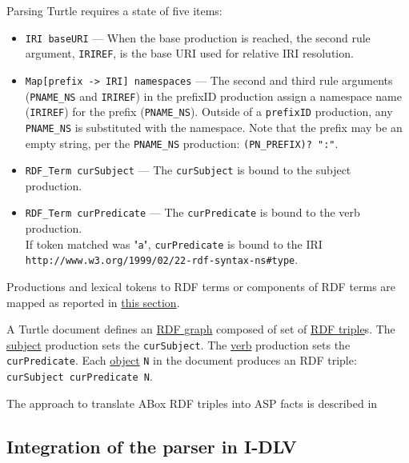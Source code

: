 \documentclass[oneside]{book}
\newcommand{\ste}[1]{\todo[color=green!40, bordercolor=green!80, author=Stefano]{#1}{}}
\begin{document}
Parsing Turtle requires a state of five items:
\begin{itemize}
	\item \texttt{IRI baseURI} — When the base production is reached, the second rule argument, \texttt{IRIREF}, is the base URI used for relative IRI resolution. 
	\item \texttt{Map[prefix -> IRI] namespaces} — The second and third rule arguments (\texttt{PNAME\_NS} and \texttt{IRIREF}) in the prefixID production assign a namespace name (\texttt{IRIREF}) for the prefix (\texttt{PNAME\_NS}). Outside of a \texttt{prefixID} production, any \texttt{PNAME\_NS} is substituted with the namespace. Note that the prefix may be an empty string, per the \texttt{PNAME\_NS} production: \texttt{(PN\_PREFIX)? ":"}. 
	\item \texttt{RDF\_Term curSubject} — The \texttt{curSubject} is bound to the subject production.
	\item \texttt{RDF\_Term curPredicate} — The \texttt{curPredicate} is bound to the verb production.\\
	If token matched was "\texttt{a}", \texttt{curPredicate} is bound to the IRI\\
	\texttt{http://www.w3.org/1999/02/22-rdf-syntax-ns\#type}.
\end{itemize}

Productions and lexical tokens to RDF terms or components of RDF terms are mapped as reported in \href{https://www.w3.org/TR/turtle/#sec-parsing-terms}{this section}.

A Turtle document defines an \href{http://www.w3.org/TR/rdf11-concepts/#dfn-rdf-graph}{RDF graph} composed of set of \href{http://www.w3.org/TR/rdf11-concepts/#dfn-rdf-triple}{RDF triple}s. The \href{https://www.w3.org/TR/turtle/#grammar-production-subject}{subject} production sets the \texttt{curSubject}.
The \href{https://www.w3.org/TR/turtle/#grammar-production-verb}{verb} production sets the \texttt{curPredicate}.
Each \href{https://www.w3.org/TR/turtle/#grammar-production-object}{object} \texttt{N} in the document produces an RDF triple: \texttt{curSubject curPredicate N}.

The approach to translate ABox RDF triples into ASP facts is described in \ste{Fix section reference}

\subsection{Integration of the parser in I-DLV}
\end{document}
